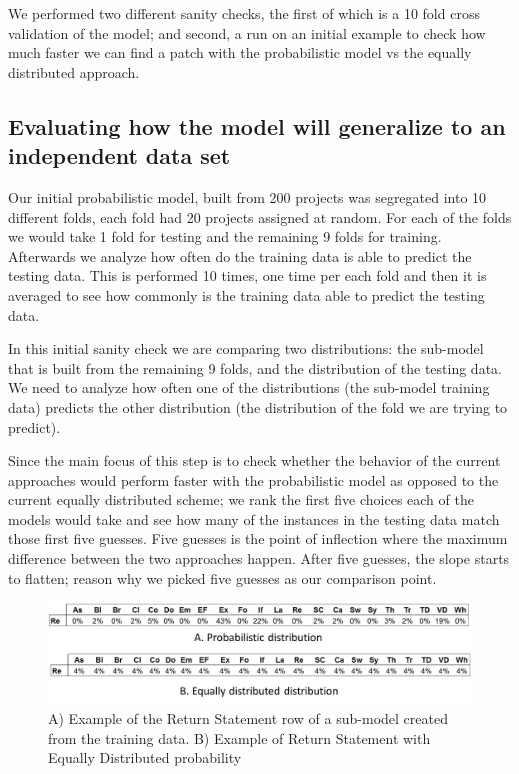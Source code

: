 \documentclass[conference]{IEEEtran}
\begin{document}
We performed two different sanity checks, the first of which is a 10 fold cross 
validation of the model; and second, a run on an initial example to check how 
much faster we can find a patch with the probabilistic model vs the equally 
distributed approach.

\subsection{Evaluating how the model will generalize to an independent data set}

Our initial probabilistic model, built from 200 projects was segregated into 10 
different folds, each fold had 20 projects assigned at random. For each of the 
folds we would take 1 fold for testing and the remaining 9 folds for training. 
Afterwards we analyze how often do the training data is able to predict the 
testing data. This is performed 10 times, one time per each fold and then it is 
averaged to see how commonly is the training data able to predict the testing 
data.

In this initial sanity check we are comparing two distributions: the sub-model 
that is built from the remaining 9 folds, and the distribution of the testing 
data. We need to analyze how often one of the distributions (the sub-model 
training data) predicts the other distribution (the distribution of the fold we 
are trying to predict). 

Since the main focus of this step is to check whether the behavior of the 
current approaches would perform faster with the probabilistic model as opposed 
to the current equally distributed scheme; we rank the first five choices each 
of the models would take and see how many of the instances in the testing data 
match those first five guesses. Five guesses is the point of inflection where the maximum difference between the two approaches happen. After five guesses, the slope starts to flatten; reason why we picked five guesses as our comparison point.

\begin{figure}[!h]
  \centering
    \includegraphics[scale=0.25]{sanity5}
  \caption{A) Example of the Return Statement row of a sub-model created from 
the 
training data. B) Example of Return Statement with Equally Distributed 
probability}
  \label{fig:exPredReturn}
\end{figure}
\end{document}
